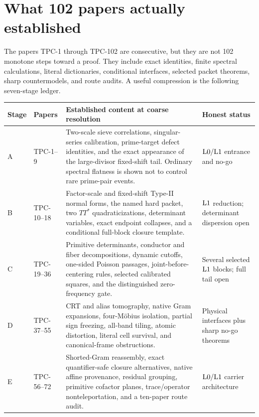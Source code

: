 \section{What 102 papers actually established}
\label{sec:century-audit}

The papers TPC-1 through TPC-102 are consecutive, but they are not
102 monotone steps toward a proof.  They include exact identities,
finite spectral calculations, literal dictionaries, conditional
interfaces, selected packet theorems, sharp countermodels, and route
audits.  A useful compression is the following seven-stage ledger.

\begin{table}[ht]
\centering
\small
\begin{tabularx}{\textwidth}{@{}
  >{\raggedright\arraybackslash}p{0.9cm}
  >{\raggedright\arraybackslash}p{1.55cm}
  Y
  >{\raggedright\arraybackslash}p{2.0cm}@{}}
\toprule
Stage & Papers & Established content at coarse resolution & Honest status\\
\midrule
A & TPC-1--9 &
Two-scale sieve correlations, singular-series calibration,
prime-target defect identities, and the exact appearance of the
large-divisor fixed-shift tail.  Ordinary spectral flatness is shown
not to control rare prime-pair events. &
\(\mathrm{L0}/\mathrm{L1}\) entrance and no-go\\

B & TPC-10--18 &
Factor-scale and fixed-shift Type-II normal forms, the named hard
packet, two \(TT^*\) quadraticizations, determinant variables, exact
endpoint collapses, and a conditional full-block closure template. &
\(\mathrm{L1}\) reduction; determinant dispersion open\\

C & TPC-19--36 &
Primitive determinants, conductor and fiber decompositions, dynamic
cutoffs, one-sided Poisson passages, joint-before-centering rules,
selected calibrated squares, and the distinguished zero-frequency
gate. &
Several selected \(\mathrm{L1}\) blocks; full tail open\\

D & TPC-37--55 &
CRT and alias tomography, native Gram expansions, four-M\"obius
isolation, partial sign freezing, all-band tiling, atomic distortion,
literal cell survival, and canonical-frame obstructions. &
Physical interfaces plus sharp no-go theorems\\

E & TPC-56--72 &
Shorted-Gram reassembly, exact quantifier-safe closure alternatives,
native affine provenance, residual grouping, primitive cofactor
planes, trace/operator nonteleportation, and a ten-paper route audit. &
\(\mathrm{L0}/\mathrm{L1}\) carrier architecture\\


\end{tabularx}
\end{table}
